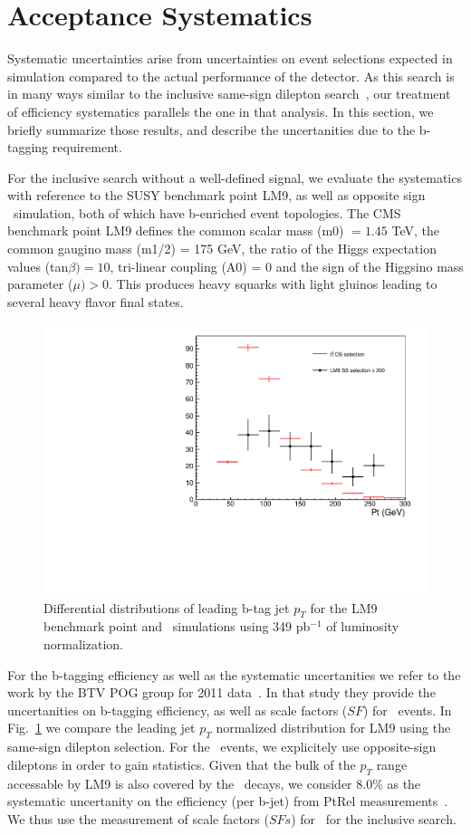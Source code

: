 \section{Acceptance Systematics}
\label{sec:systematic}
Systematic uncertainties arise from uncertainties on event selections expected in simulation compared to the actual performance of 
the detector. As this search is in many ways similar to the inclusive same-sign dilepton search~\cite{ssnote2011}, 
our treatment of efficiency systematics parallels the one in that analysis.
In this section, we briefly summarize those results, and
describe the uncertanities due to the b-tagging requirement.

For the inclusive search without a well-defined signal, 
we evaluate the systematics with reference to the SUSY benchmark point LM9, 
as well as opposite sign \ttbar\ simulation, both of which have b-enriched event topologies. The CMS benchmark point LM9 defines the 
common scalar mass (m0) $ = 1.45$ TeV, the common gaugino mass (m1/2) = 175 GeV, the ratio of the Higgs expectation
values (tan$\beta)  = 10$, tri-linear coupling (A0) = 0 and the  sign of the Higgsino mass parameter ($\mu) > 0$. This produces heavy squarks
with light gluinos leading to several heavy flavor final states.

\begin{figure}[htb]
\begin{center}
\includegraphics[width=0.6\linewidth, height=0.36\linewidth]{figs/bjetleading.pdf}
\caption{ Differential distributions of leading b-tag jet $p_T$ for the LM9 benchmark point and \ttbar\ simulations using 349 pb$^{-1}$ of luminosity normalization.\label{fig:lm9ttbar}}
\end{center}
\end{figure}

For the b-tagging efficiency as well as the systematic uncertanities we refer to the
work by the BTV POG group for 2011
data~\cite{BTVPAS2011}. In that study they provide the uncertanities on b-tagging efficiency, 
as well as scale factors ($SF$) for \ttbar\ events. In Fig.~\ref{fig:lm9ttbar} 
we compare the leading jet $p_T$ normalized distribution for LM9 using the same-sign dilepton selection. For the \ttbar\ events, we 
explicitely use opposite-sign dileptons in order to gain statistics. Given that the bulk of the $p_T$ range accessable by LM9 is also covered by the \ttbar\ decays, 
we consider 8.0\% as the systematic uncertanity on the efficiency (per b-jet) from PtRel measurements~\cite{BTVPAS2011}. We thus use the measurement of scale factors ($SFs$) 
for \ttbar\ for the inclusive search.

